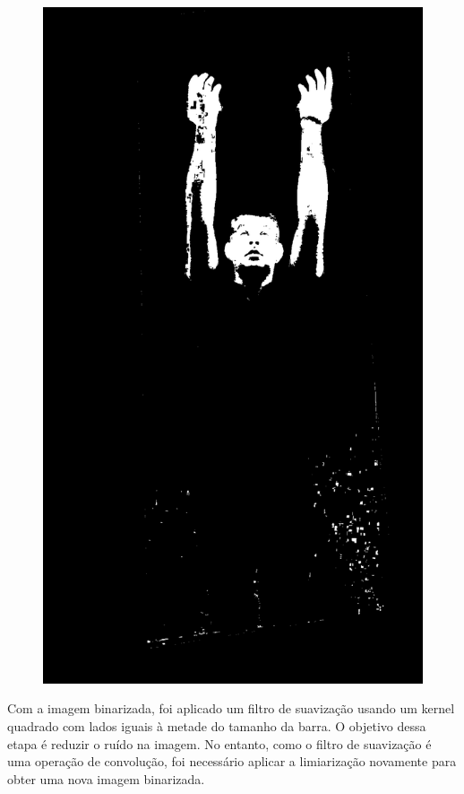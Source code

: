 \begin{figure}[H]
\begin{minipage}{\sizeImg\textwidth}
            \includegraphics[width=\textwidth]{figuras/mao_barra/limited.png}
        \end{minipage}
    \label{fig:gray_limited}
\end{figure}


Com a imagem binarizada, foi aplicado um filtro de suavização usando um kernel quadrado com lados iguais à metade do tamanho da barra. O objetivo dessa etapa é reduzir o ruído na imagem. No entanto, como o filtro de suavização é uma operação de convolução, foi necessário aplicar a limiarização novamente para obter uma nova imagem binarizada.

